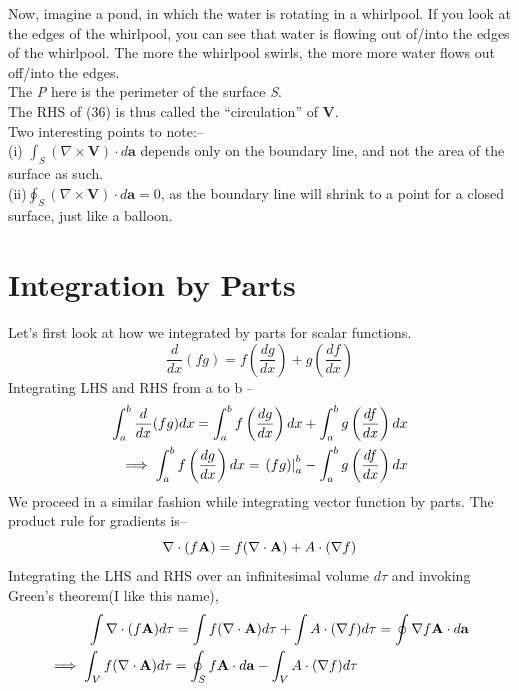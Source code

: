 \documentclass[12pt]{article}
\begin{document}
Now, imagine a pond, in which the water is rotating in a whirlpool. If you look at the edges of the whirlpool, you can see that water is flowing out of/into the edges of the whirlpool.
The more the whirlpool swirls, the more more water flows out off/into the edges. \\
The \textit{P} here is the perimeter of the surface \textit{S}. \\The RHS of (36) is thus called the ``circulation'' of \textbf{V}. \\
Two interesting points to note:--\\
(i) $\int_{S}(\nabla \times \mathbf{V})\cdot d\mathbf{a}$ depends only on the boundary line, and not the area of the surface as such. \\
(ii)$\oint_{S}(\nabla \times \mathbf{V})\cdot d\mathbf{a} = 0$, as the boundary line will shrink to a point for a closed surface, just like a balloon. \\

\section{Integration by Parts}
Let's first look at how we integrated by parts for scalar functions. 
\begin{equation}
    \frac{d}{dx}(fg)=f\left(\frac{dg}{dx}\right)+g\left(\frac{df}{dx}\right)
\end{equation}
Integrating LHS and RHS from a to b --
\begin{align}
\int_{a}^{b}\frac{d}{dx}(fg)dx = \int_{a}^{b}f\left(\frac{dg}{dx}\right)dx + \int_{a}^{b}g\left(\frac{df}{dx}\right)dx\notag \\
\implies \int_{a}^{b}f\left(\frac{dg}{dx}\right)dx = \left. (fg)\right|_{a}^{b}-\int_{a}^{b}g\left(\frac{df}{dx}\right)dx
\end{align}
We proceed in a similar fashion while integrating vector function by parts. The product rule for gradients is-- 
\begin{equation}
    \nabla\cdot(f\mathbf{A}) = f(\nabla\cdot\mathbf{A})+A\cdot(\nabla f) \notag
\end{equation}
Integrating the LHS and RHS over an infinitesimal volume $d\tau$ and invoking Green's theorem(I like this name),
\begin{align}
    \int \nabla\cdot(f\mathbf{A}) d\tau = \int f(\nabla\cdot\mathbf{A})d\tau+\int A\cdot(\nabla f)d\tau = \oint \nabla f\mathbf{A}\cdot d\mathbf{a} \notag \\
    \implies \int_{V} f(\nabla\cdot\mathbf{A})d\tau = \oint_{S} f\mathbf{A}\cdot d\mathbf{a}-\int_{V} A\cdot(\nabla f)d\tau \hspace{2.8cm}
\end{align}
\end{document}
